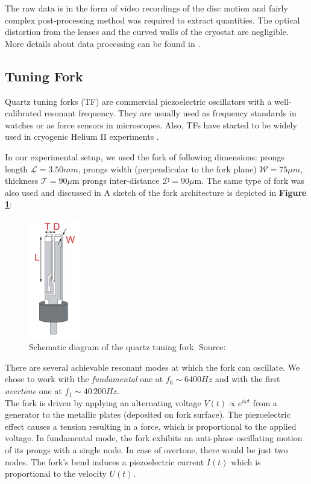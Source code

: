The raw data is in the form of video recordings of the disc motion and fairly complex post-processing method was required to extract quantities. The optical distortion from the lenses and the curved walls of the cryostat are negligible. More details about data processing can be found in \cite{universal_scaling}.

\subsection{Tuning Fork}

Quartz tuning forks (TF) are commercial piezoelectric oscillators with a well-calibrated resonant frequency. They are usually used as frequency standards in watches or as force sensors in microscopes. Also, TFs have started to be widely used in cryogenic Helium II experiments \cite{forks}.

In our experimental setup, we used the fork of following dimensions: prongs length $ \mathcal{L} = 3.50\unit{mm} $, prongs width (perpendicular to the fork plane) $ \mathcal{W}=75 \mu\unit{m} $, thickness $ \mathcal{T}=90\mu\text{m} $ prongs inter-distance $ \mathcal{D}=90\mu\text{m} $.
The same type of fork was also used and discussed in \cite{fork-exp} \cite{multiple-vels} A sketch of the fork architecture is depicted in \textbf{Figure \ref{fork}}:

\begin{figure}[h]
	\centering
	\includegraphics[width=0.2\textwidth]{graphics/exp/quartz}
	\caption{Schematic diagram of the quartz tuning fork. Source: \cite{bakalaris}}
	\label{fork}
\end{figure}

There are several achievable resonant modes at which the fork can oscillate. We chose to work with the \textit{fundamental} one at $f_0 \sim 6400 \unit{Hz}$ and with the first \textit{overtone} one at $f_1 \sim 40\,200 \unit{Hz}$.\\
The fork is driven by applying an alternating voltage $V(t) \propto e^{i\omega t}$ from a generator to the metallic plates (deposited on fork surface). The piezoelectric effect causes a tension resulting in a force, which is proportional to the applied voltage. In fundamental mode, the fork exhibits an anti-phase oscillating motion of its prongs with a single node. In case of overtone, there would be just two nodes. The fork's bend induces a piezoelectric current $I(t)$ which is proportional to the velocity $U(t)$.

